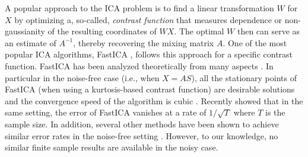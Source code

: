 \documentclass[twoside,11pt]{article}
\begin{document}
A popular approach to the ICA problem is to find a linear transformation $W$ for $X$ by optimizing a, so-called, \emph{contrast function} 
that measures dependence or non-gaussianity of the resulting coordinates of $WX$.
The optimal $W$ then can serve as an estimate of $A^{-1}$, thereby recovering the mixing matrix $A$.
One of the most popular ICA algorithms, FastICA \citep{hyvarinen1999fast},
follows this approach for a specific contrast function.  
FastICA has been analyzed theoretically from many aspects \citep{douglas2003convergence,tichavsky2006performance,oja2006fastica,ollila2010deflation,dermoune2013fastica,wei2014convergence}.
In particular in the noise-free case (i.e., when $X = AS$), all the stationary points of FastICA (when using a kurtosis-based contrast function) are desirable solutions and the convergence speed of the algorithm is cubic \citep{douglas2003convergence}. 
Recently \citet{miettinen2014fourth} showed  that in the same setting, the error of FastICA vanishes at a rate of $1/\sqrt{T}$ where $T$ is the sample size.
In addition, several other methods have been shown to achieve similar error rates in the noise-free setting \citep[e.g.,][]{eriksson2003characteristic,samarov2004nonparametric,chen2005consistent,chen2006efficient}.
However, to our knowledge, no similar finite sample results are available in the noisy case.
\end{document}

